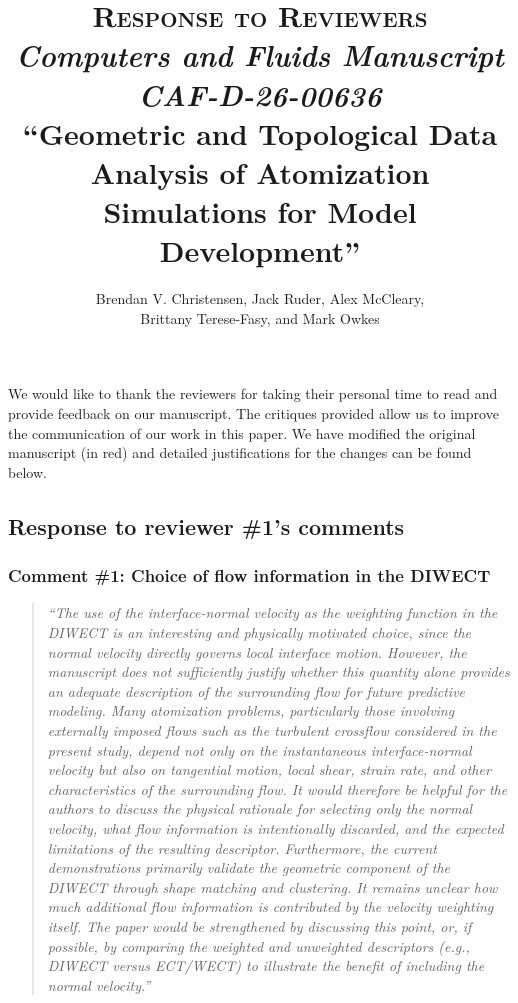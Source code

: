 \documentclass[11pt]{article}
\title{\textsc{Response to Reviewers}\\ \medskip \Large{\textit{Computers and Fluids Manuscript CAF-D-26-00636}} \\
  \medskip \large{\textbf{``Geometric and Topological Data Analysis of Atomization Simulations for Model Development''}}}
\author{Brendan V. Christensen, Jack Ruder, Alex McCleary,\\ Brittany Terese-Fasy, and Mark Owkes}
\begin{document}
\maketitle

\vspace{0.5cm}

We would like to thank the reviewers for taking their personal time to read and provide feedback on our manuscript. The critiques provided allow us to improve the communication of our work in this paper. We have modified the original manuscript (in red) and detailed justifications for the changes can be found below.

\subsection*{Response to reviewer \#1's  comments}

\subsubsection*{Comment \#1: Choice of flow information in the DIWECT}
\begin{quote}
{\it ``The use of the interface-normal velocity as the weighting function in the DIWECT is an interesting and physically motivated choice, since the normal velocity directly governs local interface motion. However, the manuscript does not sufficiently justify whether this quantity alone provides an adequate description of the surrounding flow for future predictive modeling. Many atomization problems, particularly those involving externally imposed flows such as the turbulent crossflow considered in the present study, depend not only on the instantaneous interface-normal velocity but also on tangential motion, local shear, strain rate, and other characteristics of the surrounding flow. It would therefore be helpful for the authors to discuss the physical rationale for selecting only the normal velocity, what flow information is intentionally discarded, and the expected limitations of the resulting descriptor. Furthermore, the current demonstrations primarily validate the geometric component of the DIWECT through shape matching and clustering. It remains unclear how much additional flow information is contributed by the velocity weighting itself. The paper would be strengthened by discussing this point, or, if possible, by comparing the weighted and unweighted descriptors (e.g., DIWECT versus ECT/WECT) to illustrate the benefit of including the normal velocity.''}
\end{quote}
\end{document}
